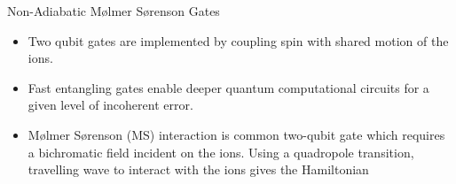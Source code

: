 \documentclass[final]{beamer}
\begin{document}
\begin{frame}{}
\begin{center}
\begin{columns}[t]
\begin{column}{0.49\textwidth}
    \begin{alertblock}{Non-Adiabatic Mølmer Sørenson Gates}
      \begin{minipage}{0.83\linewidth}
      \begin{itemize}
      \item Two qubit gates are implemented by coupling spin with shared motion of the ions.
      \item Fast entangling gates enable deeper quantum computational circuits for a given level of incoherent error.
      \item Mølmer Sørenson (MS) interaction is common two-qubit gate which requires a
      bichromatic field incident on the ions. Using a quadropole transition, travelling
      wave to interact with the ions gives the Hamiltonian
      \end{itemize}
      \end{minipage}
      \begin{minipage}{0.14\linewidth}
      \begin{figure}

\end{figure}
\end{minipage}
\end{alertblock}
\end{column}
\end{columns}
\end{center}
\end{frame}
\end{document}
